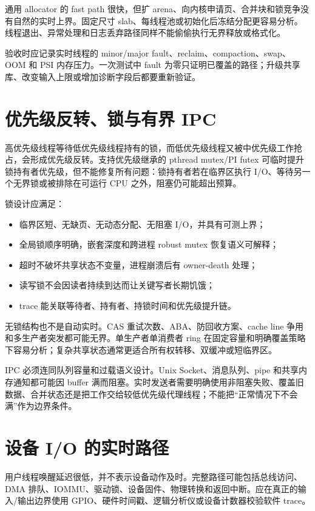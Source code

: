 通用 allocator 的 fast path 很快，但扩 arena、向内核申请页、合并块和锁竞争没有自然的实时上界。固定尺寸 slab、每线程池或初始化后冻结分配更容易分析。线程退出、异常处理和日志丢弃路径同样不能偷偷执行无界释放或格式化。

验收时应记录实时线程的 minor/major fault、reclaim、compaction、swap、OOM 和 PSI 内存压力。一次测试中 fault 为零只证明已覆盖的路径；升级共享库、改变输入上限或增加诊断字段后都要重新验证。

\section{优先级反转、锁与有界 IPC}

高优先级线程等待低优先级线程持有的锁，而低优先级线程又被中优先级工作抢占，会形成优先级反转。支持优先级继承的 pthread mutex/PI futex 可临时提升锁持有者优先级，但不能修复所有问题：锁持有者若在临界区执行 I/O、等待另一个无界锁或被排除在可运行 CPU 之外，阻塞仍可能超出预算。

锁设计应满足：

\begin{itemize}
  \item 临界区短、无缺页、无动态分配、无阻塞 I/O，并具有可测上界；
  \item 全局锁顺序明确，嵌套深度和跨进程 robust mutex 恢复语义可解释；
  \item 超时不破坏共享状态不变量，进程崩溃后有 owner-death 处理；
  \item 读写锁不会因读者持续到达而让关键写者长期饥饿；
  \item trace 能关联等待者、持有者、持锁时间和优先级提升链。
\end{itemize}

无锁结构也不是自动实时。CAS 重试次数、ABA、防回收方案、cache line 争用和多生产者突发都可能无界。单生产者单消费者 ring 在固定容量和明确覆盖策略下容易分析；复杂共享状态通常更适合所有权转移、双缓冲或短临界区。

IPC 必须连同队列容量和过载语义设计。Unix Socket、消息队列、pipe 和共享内存通知都可能因 buffer 满而阻塞。实时发送者需要明确使用非阻塞失败、覆盖旧数据、合并状态还是把工作交给较低优先级代理线程；不能把“正常情况下不会满”作为边界条件。

\section{设备 I/O 的实时路径}

用户线程唤醒延迟很低，并不表示设备动作及时。完整路径可能包括总线访问、DMA 排队、IOMMU、驱动锁、设备固件、物理转换和返回中断。应在真正的输入/输出边界使用 GPIO、硬件时间戳、逻辑分析仪或设备计数器校验软件 trace。

